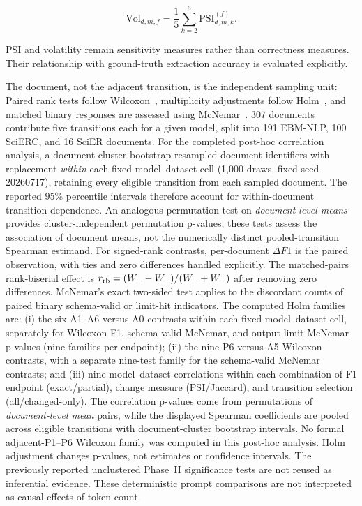 \documentclass[fleqn,10pt]{wlscirep-authoryear}
\begin{document}
\begin{equation}
\mathrm{Vol}_{d,m,f}
=
\frac{1}{5}
\sum_{k=2}^{6}
\mathrm{PSI}^{(f)}_{d,m,k}.
\end{equation}

PSI and volatility remain sensitivity measures rather than correctness measures.
Their relationship with ground-truth extraction accuracy is evaluated explicitly.

The document, not the adjacent transition, is the independent sampling unit:
Paired rank tests follow Wilcoxon~\cite{wilcoxon1945}, multiplicity adjustments
follow Holm~\cite{holm1979}, and matched binary responses are assessed
using McNemar~\cite{mcnemar1947}.
307 documents contribute five transitions each for a given model, split into
191 EBM-NLP, 100 SciERC, and 16 SciER documents. %
For the completed post-hoc correlation analysis, a document-cluster bootstrap
resampled document identifiers with replacement \emph{within} each fixed
model--dataset cell (1,000 draws, fixed seed 20260717), retaining every eligible
transition from each sampled document. The reported 95\% percentile intervals
therefore account for within-document transition dependence. An analogous
permutation test on \emph{document-level means} provides cluster-independent
permutation p-values; these tests assess the association of document means, not
the numerically distinct pooled-transition Spearman estimand. For signed-rank contrasts, per-document
\(\Delta F1\) is the paired observation, with ties and zero differences
handled explicitly. The matched-pairs rank-biserial effect is
\(r_{\rm rb}=(W_+-W_-)/(W_++W_-)\) after removing zero differences.
McNemar's exact two-sided test applies to the discordant counts of paired
binary schema-valid or limit-hit indicators. %
The computed Holm families are: (i) the six A1--A6 versus A0 contrasts
within each fixed model--dataset cell, separately for Wilcoxon F1, schema-valid
McNemar, and output-limit McNemar p-values (nine families per endpoint);
(ii) the nine P6 versus A5 Wilcoxon contrasts, with a separate nine-test
family for the schema-valid McNemar contrasts; and (iii) nine
model--dataset correlations within each combination of F1 endpoint
(exact/partial), change measure (PSI/Jaccard), and transition selection
(all/changed-only). The correlation p-values come from permutations of
\emph{document-level mean} pairs, while the displayed Spearman coefficients
are pooled across eligible transitions with document-cluster bootstrap
intervals. No formal adjacent-P1--P6 Wilcoxon family was computed in this
post-hoc analysis. Holm adjustment changes p-values, not estimates or confidence
intervals. The previously reported unclustered Phase~II significance tests
are not reused as inferential evidence. These deterministic prompt comparisons
are not interpreted as causal effects of token count.
\end{document}
